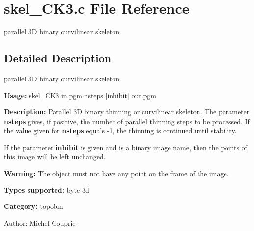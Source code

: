 \section{skel\_\-CK3.c File Reference}
\label{skel__CK3_8c}
parallel 3D binary curvilinear skeleton  




\label{_details}
\subsection{Detailed Description}
parallel 3D binary curvilinear skeleton 

{\bf Usage:} skel\_\-CK3 in.pgm nsteps [inhibit] out.pgm

{\bf Description:} Parallel 3D binary thinning or curvilinear skeleton. The parameter {\bf nsteps} gives, if positive, the number of parallel thinning steps to be processed. If the value given for {\bf nsteps} equals -1, the thinning is continued until stability.

If the parameter {\bf inhibit} is given and is a binary image name, then the points of this image will be left unchanged.

{\bf Warning:} The object must not have any point on the frame of the image.

{\bf Types supported:} byte 3d

{\bf Category:} topobin

\begin{Desc}
\item[Author:]Michel Couprie \end{Desc}

